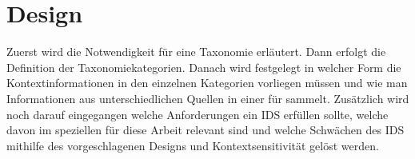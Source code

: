 \chapter{Design}%
\label{cha:design}

Zuerst wird die Notwendigkeit für eine Taxonomie erläutert. Dann erfolgt die Definition der Taxonomiekategorien. Danach wird festgelegt in welcher Form die Kontextinformationen in den einzelnen Kategorien vorliegen müssen und wie man Informationen aus unterschiedlichen Quellen in einer für sammelt. Zusätzlich wird noch darauf eingegangen welche Anforderungen ein IDS erfüllen sollte, welche davon im speziellen für diese Arbeit relevant sind und welche Schwächen des IDS mithilfe des vorgeschlagenen Designs und Kontextsensitivität gelöst werden.
